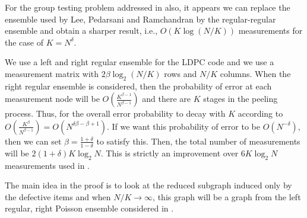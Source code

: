 \documentclass[journal,draft,onecolumn]{IEEEtran}
\begin{document}
For the group testing problem addressed in \cite{lee2015saffron} also, it appears we can replace the ensemble used by Lee, Pedarsani and Ramchandran by the regular-regular ensemble and obtain a sharper result, i.e., $O(K \log (N/K))$ measurements for the case of $K = N^\delta$.

We use a left and right regular ensemble for the LDPC code and we use a measurement matrix with $2 \beta \log_2(N/K)$ rows and $N/K$ columns. When the right regular ensemble is considered, then the probability of error at each measurement node will be $O\left(\frac{K^{\beta-1}}{N^{\beta-1}}\right)$ and there are $K$ stages in the peeling process. Thus, for the overall error probability to decay with $K$ according to $O\left(\frac{K^{\beta}}{N^{\beta-1}}\right) = O\left(N^{\delta \beta - \beta + 1}\right)$. If we want this probability of error to be $O(N^{-\delta})$, then we can set $\beta = \frac{1+\delta}{1-\delta}$ to satisfy this. Then, the total number of measurements will be $2 (1+\delta) K \log_2 N$. This is strictly an improvement over $6 K \log_2 N$ measurements used in \cite{lee2015saffron}.

The main idea in the proof is to look at the reduced subgraph induced only by the defective items and when $N/K \rightarrow \infty$, this graph will be a graph from the left regular, right Poisson ensemble considered in \cite{lee2015saffron}.


\end{document}
